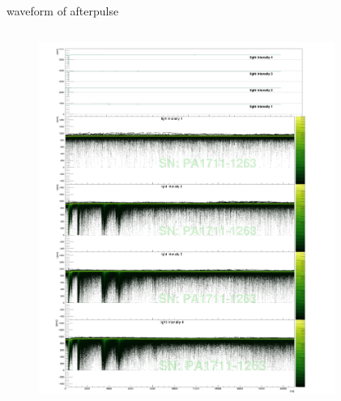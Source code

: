 \documentclass[11pt,compress,xcolor=x11names,UTF8]{beamer}
\begin{document}
\begin{frame}{waveform of afterpulse}
\vspace{-1.3cm}
\begin{columns}
\begin{column}{.485\textwidth}
\begin{figure}
\centering
	\includegraphics[width=1.049\textwidth]{figure/PA1711-1263_avewave}
\end{figure}
\end{column}
\begin{column}{.485\textwidth}
\begin{figure}
\centering

\end{figure}
\end{column}
\end{columns}
\end{frame}
\end{document}
